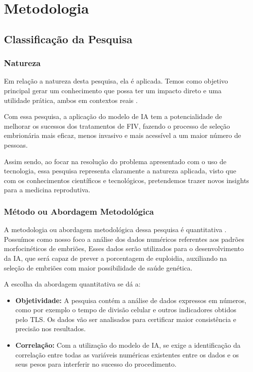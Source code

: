 \chapter[Metodologia]{Metodologia}

\section{Classificação da Pesquisa}

\subsection{Natureza}

Em relação a natureza desta pesquisa, ela é aplicada. Temos como objetivo principal gerar um conhecimento que possa ter um impacto direto e uma utilidade prática, ambos em contextos reais \cite{nascimento2016}. 

Com essa pesquisa, a aplicação do modelo de IA tem a potencialidade de melhorar os sucessos dos tratamentos de FIV, fazendo o processo de seleção embrionária mais eficaz, menos invasivo e mais acessível a um maior número de pessoas.

Assim sendo, ao focar na resolução do problema apresentado com o uso de tecnologia, essa pesquisa representa claramente a natureza aplicada, visto que com os conhecimentos científicos e tecnológicos, pretendemos trazer novos insights para a medicina reprodutiva. 

\subsection{Método ou Abordagem Metodológica}

A metodologia ou abordagem metodológica dessa pesquisa é quantitativa \cite{nascimento2016}. Possuímos como nosso foco a análise dos dados numéricos referentes aos padrões morfocinéticos de embriões, Esses dados serão utilizados para o desenvolvimento da IA, que será capaz de prever a porcentagem de euploidia, auxiliando na seleção de embriões com maior possibilidade de saúde genética.

A escolha da abordagem quantitativa se dá a: 

\begin{itemize}
  \item \textbf{Objetividade:} A pesquisa contém a análise de dados expressos em números, como por exemplo o tempo de divisão celular e outros indicadores obtidos pelo TLS. Os dados vão ser analisados para certificar maior consistência e precisão nos resultados.
  \item \textbf{Correlação:} Com a utilização do modelo de IA, se exige a identificação da correlação entre todas as variáveis numéricas existentes entre os dados e os seus pesos para interferir no sucesso do procedimento. 
\end{itemize}

